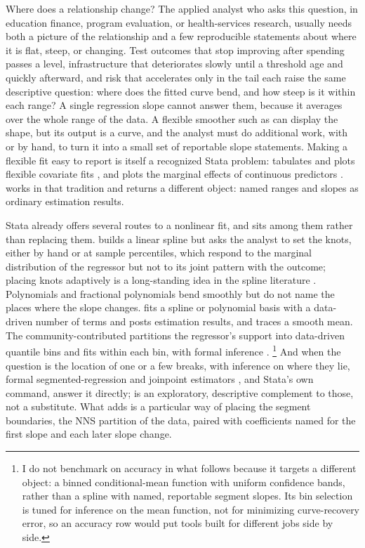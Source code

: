 \documentclass[bib]{statapress}
\begin{document}
Where does a relationship change?  The applied analyst who asks this
question, in education finance, program evaluation, or health-services
research, usually needs both a picture of the relationship and a few
reproducible statements about where it is flat, steep, or changing.  Test
outcomes that stop improving after spending passes a level, infrastructure
that deteriorates slowly until a threshold age and quickly afterward, and risk
that accelerates only in the tail each raise the same descriptive question:
where does the fitted curve bend, and how steep is it within each range?  A
single regression slope
cannot answer them, because it averages over the whole range of the data.  A
flexible smoother such as  \citep{stata_2025} can
display the shape, but its output is a curve, and the analyst must do
additional work, with  or by hand, to turn it into a small set
of reportable slope statements.  Making a flexible fit easy to report is
itself a recognized Stata problem:  tabulates and plots flexible
covariate fits \citep{orsini_greenland_2011}, and 
plots the marginal effects of continuous predictors \citep{royston_2013_mcp}.
 works in that tradition and returns a different object: named
ranges and slopes as ordinary estimation results.

Stata already offers several routes to a nonlinear fit, and 
sits among them rather than replacing them.   builds a linear
spline but asks the analyst to set the knots, either by hand or at sample
percentiles, which respond to the marginal distribution of the regressor but
not to its joint pattern with the outcome; placing knots adaptively is a
long-standing idea in the spline literature \citep{friedman_1991}.
Polynomials and fractional polynomials \citep{royston_altman_1994} bend
smoothly but do not name the places where the slope changes.
 fits a spline or
polynomial basis with a data-driven number of terms and posts estimation
results, and  traces a smooth mean.  The
community-contributed  partitions the regressor's support into
data-driven quantile bins and fits within each bin, with formal inference
\citep{cattaneo_etal_2024_aer,cattaneo_etal_2025_binsreg}.%
\footnote{I do not benchmark  on accuracy in what follows
because it targets a different object: a binned conditional-mean function with
uniform confidence bands, rather than a spline with named, reportable segment
slopes.  Its bin selection is tuned for inference on the mean function, not for
minimizing curve-recovery error, so an accuracy row would put tools built for
different jobs side by side.}  And when the
question is the location of one or a few breaks, with inference on where they
lie, formal segmented-regression and joinpoint estimators
\citep{muggeo_2003,kim_etal_2000}, and Stata's own  command,
answer it directly;  is an exploratory, descriptive complement
to those, not a substitute.  What 
adds is a particular way of placing the segment boundaries, the NNS partition
of the data, paired with coefficients named for the first slope and each
later slope change.
\end{document}
